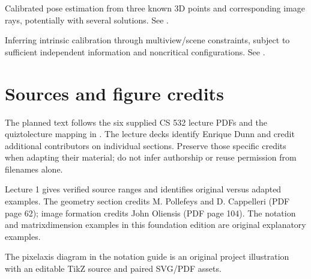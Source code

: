 \documentclass[letterpaper,11pt,english,openany,oneside]{jupyterBook}
\begin{document}
\begin{description}
\sphinxAtStartPar
Calibrated pose estimation from three known 3D points and corresponding image rays, potentially with several solutions. See {\hyperref[\detokenize{lectures/lecture06/pipeline:lec06-pipeline}]{}}.

\sphinxAtStartPar
Inferring intrinsic calibration through multi\sphinxhyphen{}view/scene constraints, subject to sufficient independent information and noncritical configurations. See {\hyperref[\detokenize{lectures/lecture06/pipeline:lec06-pipeline}]{}}.

\end{description}

\sphinxstepscope


\chapter{Sources and figure credits}
\label{\detokenize{reference/credits:sources-and-figure-credits}}\label{\detokenize{reference/credits:source-credits}}\label{\detokenize{reference/credits::doc}}
\sphinxAtStartPar
The planned text follows the six supplied CS 532 lecture PDFs and the quiz\sphinxhyphen{}to\sphinxhyphen{}lecture mapping in . The lecture decks identify Enrique Dunn and credit additional contributors on individual sections. Preserve those specific credits when adapting their material; do not infer authorship or reuse permission from filenames alone.

\sphinxAtStartPar
Lecture 1 gives verified source ranges and identifies original versus adapted examples. The geometry section credits M. Pollefeys and D. Cappelleri (PDF page 62); image formation credits John Oliensis (PDF page 104). The notation and matrix\sphinxhyphen{}dimension examples in this foundation edition are original explanatory examples.

\sphinxAtStartPar
The pixel\sphinxhyphen{}axis diagram in the notation guide is an original project illustration with an editable TikZ source and paired SVG/PDF assets.
\end{document}
